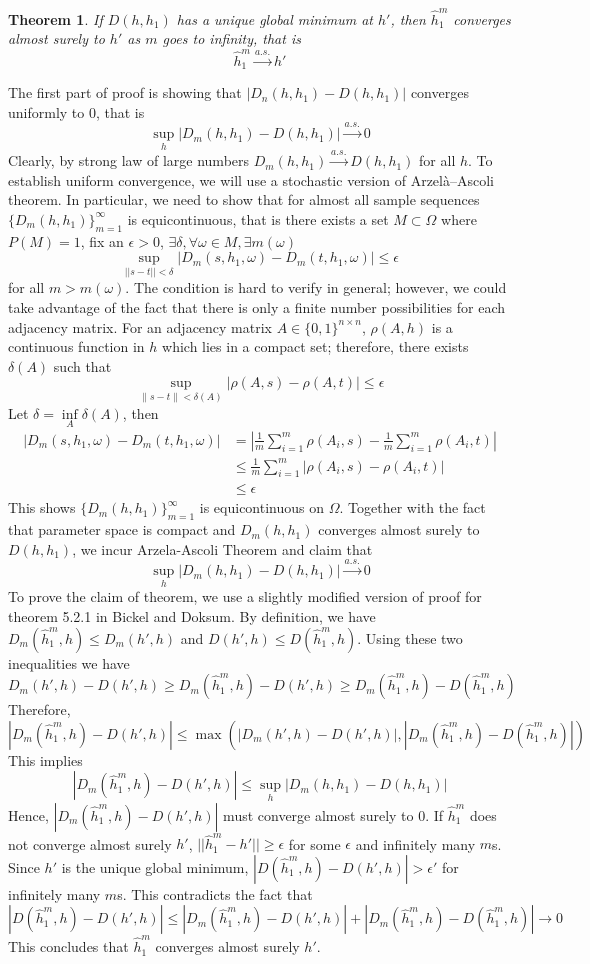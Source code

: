 \documentclass[a4paper]{article}
\newtheorem{theorem}{Theorem}[section]
\newenvironment{proof}[1][Proof]{\begin{trivlist}
\item[\hskip \labelsep {\bfseries #1}]}{\end{trivlist}}
\begin{document}
\begin{theorem}
If $D(h,h_1)$ has a unique global minimum at $h'$, then $\hat{h}_1^m$ converges almost surely to $h'$ as $m$ goes to infinity, that is 
\[ \hat{h}_1^m \overset{a.s.}{\rightarrow} h' \]
\end{theorem}
\begin{proof}
The first part of proof is showing that $|D_n(h,h_1)-D(h,h_1)|$ converges uniformly to $0$, that is \[\underset{h}{\sup}|D_m(h,h_1)-D(h,h_1)|\overset{a.s.}{\rightarrow} 0\]
Clearly, by strong law of large numbers $D_m(h,h_1) \overset{a.s.}{\rightarrow} D(h,h_1)$ for all $h$. To establish uniform convergence, we will use a stochastic version of Arzelà–Ascoli theorem. In particular, we need to show that for almost all sample sequences $\{D_m(h,h_1)\}_{m=1}^\infty$ is equicontinuous, that is there exists a set $M \subset \Omega$ where $P(M)=1$, fix an $\epsilon > 0$, $\exists \delta, \forall \omega \in M, \exists m(\omega)$
\[ \underset{||s-t||<\delta}{\sup} |D_m(s,h_1,\omega)-D_m(t,h_1,\omega)| \leq \epsilon \]
for all $m>m(\omega)$. The condition is hard to verify in general; however, we could take advantage of the fact that there is only a finite number possibilities for each adjacency matrix. For an adjacency matrix $A \in \{0,1\}^{n \times n}$, $\rho(A,h)$ is a continuous function in $h$ which lies in a compact set; therefore, there exists $\delta(A)$ such that
\[\underset{\|s-t\|<\delta(A)}{\sup}|\rho(A,s) - \rho(A,t)| \leq \epsilon\]
Let $\delta=\underset{A}{\inf} \delta(A)$, then 
\begin{align*}
|D_m(s,h_1,\omega)-D_m(t,h_1,\omega)| &=|\frac{1}{m}\sum_{i=1}^{m} \rho(A_i,s)-\frac{1}{m}\sum_{i=1}^{m} \rho(A_i,t)| \\
&\leq \frac{1}{m} \sum_{i=1}^{m} |\rho(A_i,s)-\rho(A_i,t)| \\
&\leq \epsilon
\end{align*}
This shows $\{D_m(h,h_1)\}_{m=1}^\infty$ is equicontinuous on $\Omega$.  Together with the fact that parameter space is compact and $D_m(h,h_1)$ converges almost surely to  $D(h,h_1)$, we incur Arzela-Ascoli Theorem and claim that 
\[\underset{h}{\sup}|D_m(h,h_1)-D(h,h_1)|\overset{a.s.}{\rightarrow} 0\]
To prove the claim of theorem, we use a slightly modified version of proof for theorem 5.2.1 in Bickel and Doksum. By definition, we have $D_m(\hat{h}_1^m,h)  \leq D_m(h',h)$ and $D(h',h) \leq D(\hat{h}_1^m,h)$. Using these two inequalities we have
\[D_m(h',h)-D(h',h) \geq D_m(\hat{h}_1^m,h)-D(h',h) \geq D_m(\hat{h}_1^m,h)-D(\hat{h}_1^m,h) \]
Therefore, 
\[ |D_m(\hat{h}_1^m,h)-D(h',h)| \leq \max(|D_m(h',h)-D(h',h)|,|D_m(\hat{h}_1^m,h)-D(\hat{h}_1^m,h)|) \]
This implies 
\[ |D_m(\hat{h}_1^m,h)-D(h',h)| \leq \underset{h}{\sup}|D_m(h,h_1)-D(h,h_1)| \]
Hence, $|D_m(\hat{h}_1^m,h)-D(h',h)|$ must converge almost surely to $0$. If $\hat{h}_1^m$ does not converge almost surely $h'$, $||\hat{h}_1^m-h'||\geq \epsilon$ for some $\epsilon$ and infinitely many $m$s. Since $h'$ is the unique global minimum, $|D(\hat{h}_1^m,h)-D(h',h)| > \epsilon' $ for infinitely many $m$s. This contradicts the fact that 
\[|D(\hat{h}_1^m,h)-D(h',h)| \leq |D_m(\hat{h}_1^m,h)-D(h',h)| + |D_m(\hat{h}_1^m,h)-D(\hat{h}_1^m,h)| \rightarrow 0\] 
This concludes that $\hat{h}_1^m$ converges almost surely $h'$.


\end{proof}
\end{document}
